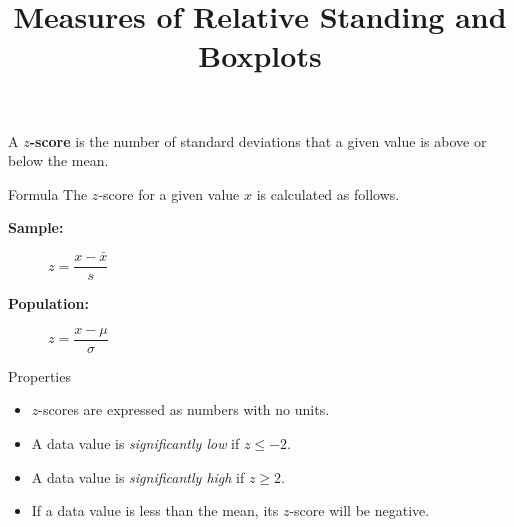 \documentclass{beamer}
\title[MA205 - Section 3.3]{Measures of Relative Standing and Boxplots}
\begin{document}
\begin{frame}
\titlepage
\end{frame}

\begin{frame}
\begin{definition}
A \textbf{$z$-score} is the number of standard deviations that a given value is above or below the mean.
\end{definition}\pause

\begin{block}{Formula}
The $z$-score for a given value $x$ is calculated as follows.
\begin{description}
\item[\textbf{Sample:}] $z=\dfrac{x-\bar{x}}{s}$
\item[\textbf{Population:}] $z=\dfrac{x-\mu}{\sigma}$
\end{description}
\end{block}\pause

\begin{block}{Properties}
\begin{itemize}[<+- | alert@+>]
\item $z$-scores are expressed as numbers with no units.
\item A data value is \emph{significantly low} if $z\leq -2$.
\item A data value is \emph{significantly high} if $z\geq 2$.
\item If a data value is less than the mean, its $z$-score will be negative.
\end{itemize}
\end{block}
\end{frame}
\end{document}
